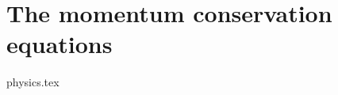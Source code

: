 















\section{The momentum conservation equations} 
\begin{flushright} {\tiny {\color{gray} physics.tex}} \end{flushright}

